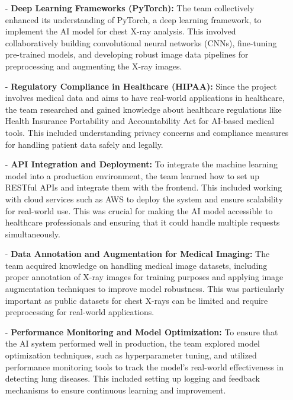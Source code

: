 \documentclass{article}
\begin{document}
\begin{itemize}
    \item[-] \textbf{Deep Learning Frameworks (PyTorch):} The team collectively enhanced its understanding of PyTorch, a deep learning framework, to implement the AI model for chest X-ray analysis. This involved collaboratively building convolutional neural networks (CNNs), fine-tuning pre-trained models, and developing robust image data pipelines for preprocessing and augmenting the X-ray images.
        
    \item[-] \textbf{Regulatory Compliance in Healthcare (HIPAA):} Since the project involves medical data and aims to have real-world applications in healthcare, the team researched and gained knowledge about healthcare regulations like Health Insurance Portability and Accountability Act for AI-based medical tools. This included understanding privacy concerns and compliance measures for handling patient data safely and legally. 
        
    \item[-] \textbf{API Integration and Deployment:} To integrate the machine learning model into a production environment, the team learned how to set up RESTful APIs and integrate them with the frontend. This included working with cloud services such as AWS to deploy the system and ensure scalability for real-world use. This was crucial for making the AI model accessible to healthcare professionals and ensuring that it could handle multiple requests simultaneously. 
        
    \item[-] \textbf{Data Annotation and Augmentation for Medical Imaging:} The team acquired knowledge on handling medical image datasets, including proper annotation of X-ray images for training purposes and applying image augmentation techniques to improve model robustness. This was particularly important as public datasets for chest X-rays can be limited and require preprocessing for real-world applications. 
        
    \item[-] \textbf{Performance Monitoring and Model Optimization:} To ensure that the AI system performed well in production, the team explored model optimization techniques, such as hyperparameter tuning, and utilized performance monitoring tools to track the model's real-world effectiveness in detecting lung diseases. This included setting up logging and feedback mechanisms to ensure continuous learning and improvement.
\end{itemize}
\end{document}
